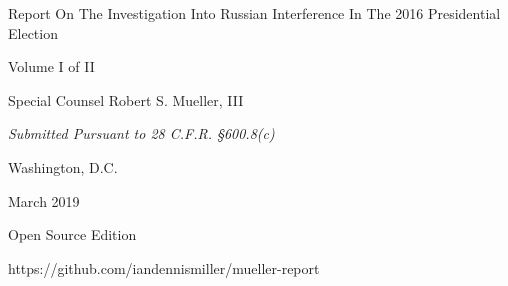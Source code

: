 \documentclass[12pt]{article}
\begin{document}
\thispagestyle{empty}

\begin{center}
\Huge
Report On The Investigation Into Russian Interference In The 2016 Presidential Election

\vspace{10 mm}

\large
Volume I of II

\vspace{10 mm}

Special Counsel Robert S. Mueller, III

\vspace{10 mm}

\normalsize

\textit{Submitted Pursuant to 28 C.F.R. \S 600.8(c)}

\vspace{20 mm}

Washington, D.C.

\vspace{10 mm}

March 2019

\vspace{10 mm}

\large
Open Source Edition

https://github.com/iandennismiller/mueller-report

\end{center}

\newpage

\tableofcontents
\newpage
{}

\sloppy








\end{document}
